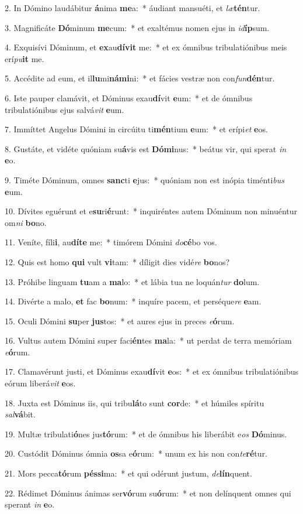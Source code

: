 2. In Dómino laudábitur \textbf{á}nima \textbf{me}a:~*  áudiant mansuéti, et \textit{læ}\textbf{tén}tur.\

3. Magnificáte \textbf{Dó}minum \textbf{me}cum:~*  et exaltémus nomen ejus in \textit{id}\textbf{íp}sum.\

4. Exquisívi Dóminum, et \textbf{ex}au\textbf{dí}\textbf{vit} me:~*  et ex ómnibus tribulatiónibus meis erí\textit{pu}\textbf{it} me.\

5. Accédite ad eum, et il\textbf{lu}mi\textbf{ná}\textbf{mi}ni:~*  et fácies vestræ non con\textit{fun}\textbf{dén}tur.\

6. Iste pauper clamávit, et Dóminus exau\textbf{dí}vit \textbf{e}um:~*  et de ómnibus tribulatiónibus ejus salvá\textit{vit} \textbf{e}um.\

7. Immíttet Angelus Dómini in circúitu ti\textbf{mén}tium \textbf{e}um:~*  et erípi\textit{et} \textbf{e}os.\

8. Gustáte, et vidéte quóniam su\textbf{á}vis est \textbf{Dó}\textbf{mi}nus:~*  beátus vir, qui sperat \textit{in} \textbf{e}o.\

9. Timéte Dóminum, omnes \textbf{sanc}ti \textbf{e}jus:~*  quóniam non est inópia timénti\textit{bus} \textbf{e}um.\

10. Dívites eguérunt et e\textbf{su}ri\textbf{é}runt:~*  inquiréntes autem Dóminum non minuéntur om\textit{ni} \textbf{bo}no.\

11. Veníte, fíli\textbf{i}, au\textbf{dí}\textbf{te} me:~*  timórem Dómini \textit{do}\textbf{cé}bo vos.\

12. Quis est homo \textbf{qui} vult \textbf{vi}tam:~*  díligit dies vidé\textit{re} \textbf{bo}nos?\

13. Próhibe linguam \textbf{tu}am a \textbf{ma}lo:~*  et lábia tua ne loquán\textit{tur} \textbf{do}lum.\

14. Divérte a malo, \textbf{et} fac \textbf{bo}num:~*  inquíre pacem, et perséque\textit{re} \textbf{e}am.\

15. Oculi Dómini \textbf{su}per \textbf{jus}tos:~*  et aures ejus in preces \textit{e}\textbf{ó}rum.\

16. Vultus autem Dómini super faci\textbf{én}tes \textbf{ma}la:~*  ut perdat de terra memóriam \textit{e}\textbf{ó}rum.\

17. Clamavérunt justi, et Dóminus exau\textbf{dí}vit \textbf{e}os:~*  et ex ómnibus tribulatiónibus eórum liberá\textit{vit} \textbf{e}os.\

18. Juxta est Dóminus iis, qui tribu\textbf{lá}to sunt \textbf{cor}de:~*  et húmiles spíritu \textit{sal}\textbf{vá}bit.\

19. Multæ tribulati\textbf{ó}nes jus\textbf{tó}rum:~*  et de ómnibus his liberábit e\textit{os} \textbf{Dó}minus.\

20. Custódit Dóminus ómnia \textbf{os}sa e\textbf{ó}rum:~*  unum ex his non con\textit{te}\textbf{ré}tur.\

21. Mors pecca\textbf{tó}rum \textbf{pés}\textbf{si}ma:~*  et qui odérunt justum, \textit{de}\textbf{lín}quent.\

22. Rédimet Dóminus ánimas ser\textbf{vó}rum su\textbf{ó}rum:~*  et non delínquent omnes qui sperant \textit{in} \textbf{e}o.\

